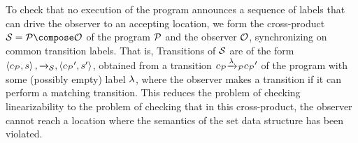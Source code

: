 To check that no execution of the program announces a sequence of labels that
can drive the observer to an accepting location, we form
the cross-product $\system=\prog\compose\observer$ of the program ${\mathcal P}$
and the observer ${\mathcal O}$, synchronizing on common transition labels.
That is, Transitions of ${\mathcal S}$ are of the form
$\left\langle c_{{\mathcal P}},s\right\rangle,{\xrightarrow{}{}}_{\!\!{\mathcal S}},\left\langle{c_{{\mathcal P}}}',s'\right\rangle$,
obtained from a transition
$c_{{\mathcal P}} {\xrightarrow{\lambda}{}}_{\!\!{\mathcal P}} {c_{{\mathcal P}}}'$ of the program with some (possibly empty)
label $\lambda$, where the observer makes a transition if it can perform a matching
transition.
This reduces the
problem of checking linearizability to the problem of checking that
in this cross-product, the observer cannot reach a location where
the semantics of the set data structure has been violated.

%




